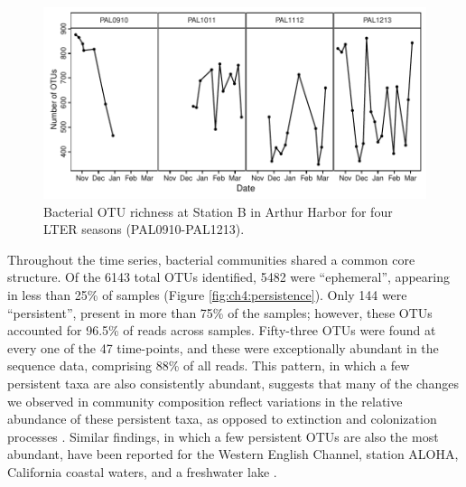 \begin{figure}[htbp] 
\centering 
\includegraphics[width=1.0\textwidth]{Chapter_5_LTER/Figures/Figure_5_richness}
\caption[Bacterial OTU richness at Station B across four LTER seasons (PAL0910-PAL1213).]{Bacterial OTU richness at Station B in Arthur Harbor for four LTER seasons (PAL0910-PAL1213).} 
\label{fig:ch4:richness} 
\end{figure}

Throughout the time series, bacterial communities shared a common core structure. Of the 6143 total OTUs identified, 5482 were ``ephemeral'', appearing in less than 25\% of samples (Figure \ref{fig:ch4:persistence}). Only 144 were ``persistent'', present in more than 75\% of the samples; however, these OTUs accounted for 96.5\% of reads across samples. Fifty-three OTUs were found at every one of the 47 time-points, and these were exceptionally abundant in the sequence data, comprising 88\% of all reads. This pattern, in which a few persistent taxa are also consistently abundant, suggests that many of the changes we observed in community composition reflect variations in the relative abundance of these persistent taxa, as opposed to extinction and colonization processes \citep{Caporaso2011-ec}. Similar findings, in which a few persistent OTUs are also the most abundant, have been reported for the Western English Channel, station ALOHA, California coastal waters, and a freshwater lake \citep{Eiler2011-jl,Eiler2012-yh,Gilbert2009-yi,Caporaso2011-ec,chow2013temporal}. 

